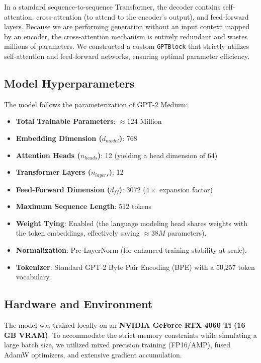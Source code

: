 \documentclass[12pt]{article}
\begin{document}
In a standard sequence-to-sequence Transformer, the decoder contains self-attention, cross-attention (to attend to the encoder's output), and feed-forward layers. Because we are performing generation without an input context mapped by an encoder, the cross-attention mechanism is entirely redundant and wastes millions of parameters. We constructed a custom \texttt{GPTBlock} that strictly utilizes self-attention and feed-forward networks, ensuring optimal parameter efficiency.

\subsection{Model Hyperparameters}
The model follows the parameterization of GPT-2 Medium:
\begin{itemize}
    \item \textbf{Total Trainable Parameters}: $\approx 124$ Million
    \item \textbf{Embedding Dimension ($d_{model}$)}: 768
    \item \textbf{Attention Heads ($n_{heads}$)}: 12 (yielding a head dimension of 64)
    \item \textbf{Transformer Layers ($n_{layers}$)}: 12
    \item \textbf{Feed-Forward Dimension ($d_{ff}$)}: 3072 ($4\times$ expansion factor)
    \item \textbf{Maximum Sequence Length}: 512 tokens
    \item \textbf{Weight Tying}: Enabled (the language modeling head shares weights with the token embeddings, effectively saving $\approx 38M$ parameters).
    \item \textbf{Normalization}: Pre-LayerNorm (for enhanced training stability at scale).
    \item \textbf{Tokenizer}: Standard GPT-2 Byte Pair Encoding (BPE) with a 50,257 token vocabulary.
\end{itemize}

\subsection{Hardware and Environment}
The model was trained locally on an \textbf{NVIDIA GeForce RTX 4060 Ti (16 GB VRAM)}. To accommodate the strict memory constraints while simulating a large batch size, we utilized mixed precision training (FP16/AMP), fused AdamW optimizers, and extensive gradient accumulation.

\newpage
\end{document}
